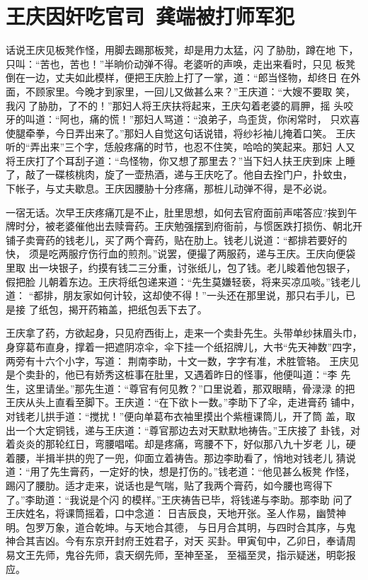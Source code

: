 \chapter{王庆因奸吃官司~龚端被打师军犯}

话说王庆见板凳作怪，用脚去踢那板凳，却是用力太猛，闪了胁肋，蹲在地
下，只叫：“苦也，苦也！”半晌价动弹不得。老婆听的声唤，走出来看时，只见
板凳倒在一边，丈夫如此模样，便把王庆脸上打了一掌，道：“郎当怪物，却终日
在外面，不顾家里。今晚才到家里，一回儿又做甚么来？”王庆道：“大嫂不要取
笑，我闪了胁肋，了不的！”那妇人将王庆扶将起来，王庆勾着老婆的肩胛，摇
头咬牙的叫道：“阿也，痛的慌！”那妇人骂道：“浪弟子，鸟歪货，你闲常时，
只欢喜使腿牵拳，今日弄出来了。”那妇人自觉这句话说错，将纱衫袖儿掩着口笑。
王庆听的“弄出来”三个字，恁般疼痛的时节，也忍不住笑，哈哈的笑起来。那妇
人又将王庆打了个耳刮子道：“鸟怪物，你又想了那里去？”当下妇人扶王庆到床
上睡了，敲了一碟核桃肉，旋了一壶热酒，递与王庆吃了。他自去拴门户，扑蚊虫，
下帐子，与丈夫歇息。王庆因腰胁十分疼痛，那桩儿动弹不得，是不必说。

一宿无话。次早王庆疼痛兀是不止，肚里思想，如何去官府面前声喏答应?挨到午
牌时分，被老婆催他出去赎膏药。王庆勉强摆到府衙前，与惯医跌打损伤、朝北开
铺子卖膏药的钱老儿，买了两个膏药，贴在肋上。钱老儿说道：“都排若要好的快，
须是吃两服疗伤行血的煎剂。”说罢，便撮了两服药，递与王庆。王庆向便袋里取
出一块银子，约摸有钱二三分重，讨张纸儿，包了钱。老儿睃着他包银子，假把脸
儿朝着东边。王庆将纸包递来道：“先生莫嫌轻亵，将来买凉瓜啖。”钱老儿道：
“都排，朋友家如何计较，这却使不得！”一头还在那里说，那只右手儿，已是接
了纸包，揭开药箱盖，把纸包丢下去了。

王庆拿了药，方欲起身，只见府西街上，走来一个卖卦先生。头带单纱抹眉头巾，
身穿葛布直身，撑着一把遮阴凉伞，伞下挂一个纸招牌儿，大书“先天神数”四字，
两旁有十六个小字，写道：
荆南李助，十文一数，字字有准，术胜管辂。
王庆见是个卖卦的，他已有娇秀这桩事在肚里，又遇着昨日的怪事，他便叫道：“李
先生，这里请坐。”那先生道：“尊官有何见教？”口里说着，那双眼睛，骨渌渌
的把王庆从头上直看至脚下。王庆道：“在下欲卜一数。”李助下了伞，走进膏药
铺中，对钱老儿拱手道：“搅扰！”便向单葛布衣袖里摸出个紫檀课筒儿，开了筒
盖，取出一个大定铜钱，递与王庆道：“尊官那边去对天默默地祷告。”王庆接了
卦钱，对着炎炎的那轮红日，弯腰唱喏。却是疼痛，弯腰不下，好似那八九十岁老
儿，硬着腰，半揖半拱的兜了一兜，仰面立着祷告。那边李助看了，悄地对钱老儿
猜说道：“用了先生膏药，一定好的快，想是打伤的。”钱老道：“他见甚么板凳
作怪，踢闪了腰肋。适才走来，说话也是气喘，贴了我两个膏药，如今腰也弯得下
了。”李助道：“我说是个闪的模样。”王庆祷告已毕，将钱递与李助。那李助
问了王庆姓名，将课筒摇着，口中念道：
日吉辰良，天地开张。圣人作易，幽赞神明。包罗万象，道合乾坤。与天地合其德，
与日月合其明，与四时合其序，与鬼神合其吉凶。今有东京开封府王姓君子，对天
买卦。甲寅旬中，乙卯日，奉请周易文王先师，鬼谷先师，袁天纲先师，至神至圣，
至福至灵，指示疑迷，明彰报应。

